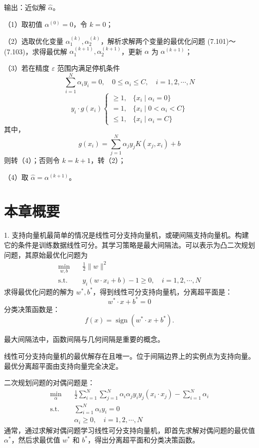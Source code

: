 \documentclass[UTF8,12pt,a4paper,fontset=fandol]{ctexart}
\begin{document}
输出：近似解 $\hat{\alpha}$。

（1）取初值 $\alpha^{(0)}=0$，令 $k=0$；

（2）选取优化变量 $\alpha_1^{(k)},\alpha_2^{(k)}$，解析求解两个变量的最优化问题 (7.101)～(7.103)，求得最优解 $\alpha_1^{(k+1)},\alpha_2^{(k+1)}$，更新 $\alpha$ 为 $\alpha^{(k+1)}$；

（3）若在精度 $\varepsilon$ 范围内满足停机条件
\[
\sum_{i=1}^N\alpha_i y_i=0,\quad 0\leq \alpha_i\leq C,\quad i=1,2,\cdots,N
\]
\[
y_i\cdot g(x_i)
\begin{cases}
\geq 1,& \{x_i\mid \alpha_i=0\}\\
=1,& \{x_i\mid 0<\alpha_i<C\}\\
\leq 1,& \{x_i\mid \alpha_i=C\}
\end{cases}
\]
其中，
\[
g(x_i)=\sum_{j=1}^N\alpha_jy_jK(x_j,x_i)+b
\]
则转（4）；否则令 $k=k+1$，转（2）；

（4）取 $\hat{\alpha}=\alpha^{(k+1)}$。

\section*{本章概要}

1. 支持向量机最简单的情况是线性可分支持向量机，或硬间隔支持向量机。构建它的条件是训练数据线性可分。其学习策略是最大间隔法。可以表示为凸二次规划问题，其原始最优化问题为
\[
\begin{aligned}
\min_{w,b}\quad & \frac{1}{2}\|w\|^2\\
\mathrm{s.t.}\quad & y_i(w\cdot x_i+b)-1\geq 0,\quad i=1,2,\cdots,N
\end{aligned}
\]
求得最优化问题的解为 $w^*,b^*$，得到线性可分支持向量机，分离超平面是：
\[
w^*\cdot x+b^*=0
\]
分类决策函数是：
\[
f(x)=\operatorname{sign}(w^*\cdot x+b^*).
\]

最大间隔法中，函数间隔与几何间隔是重要的概念。

线性可分支持向量机的最优解存在且唯一。位于间隔边界上的实例点为支持向量。最优分离超平面由支持向量完全决定。

二次规划问题的对偶问题是：
\[
\begin{aligned}
\min_\alpha\quad & \frac{1}{2}\sum_{i=1}^N\sum_{j=1}^N\alpha_i\alpha_j y_i y_j(x_i\cdot x_j)-\sum_{i=1}^N\alpha_i\\
\mathrm{s.t.}\quad & \sum_{i=1}^N\alpha_i y_i=0\\
& \alpha_i\geq 0,\quad i=1,2,\cdots,N
\end{aligned}
\]
通常，通过求解对偶问题学习线性可分支持向量机，即首先求解对偶问题的最优值 $\alpha^*$，然后求最优值 $w^*$ 和 $b^*$，得出分离超平面和分类决策函数。
\end{document}
